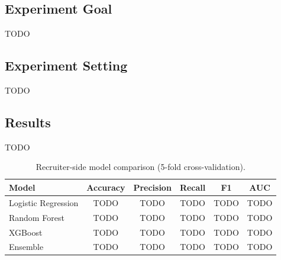 \subsection{Experiment Goal}
\label{sec:exp_recruiter_goal}

TODO

\subsection{Experiment Setting}
\label{sec:exp_recruiter_setting}

TODO

\subsection{Results}
\label{sec:exp_recruiter_results}

TODO

\begin{table}[htbp]
    \centering
    \caption{Recruiter-side model comparison (5-fold cross-validation).}
    \label{tab:recruiter_results}
    \begin{tabular}{|l|c|c|c|c|c|}
        \hline
        \textbf{Model} & \textbf{Accuracy} & \textbf{Precision} & \textbf{Recall} & \textbf{F1} & \textbf{AUC} \\
        \hline
        Logistic Regression & TODO & TODO & TODO & TODO & TODO \\
        Random Forest       & TODO & TODO & TODO & TODO & TODO \\
        XGBoost             & TODO & TODO & TODO & TODO & TODO \\
        Ensemble            & TODO & TODO & TODO & TODO & TODO \\
        \hline
    \end{tabular}
\end{table}

